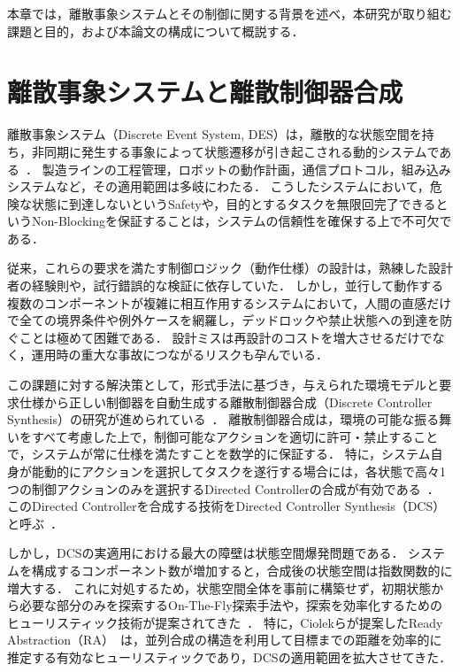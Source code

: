 \documentclass[a4paper,11pt,oneside,openany,report,dvipdfmx]{jsbook}
\begin{document}
本章では，離散事象システムとその制御に関する背景を述べ，本研究が取り組む課題と目的，および本論文の構成について概説する．

\section{離散事象システムと離散制御器合成}

離散事象システム（Discrete Event System, DES）は，離散的な状態空間を持ち，非同期に発生する事象によって状態遷移が引き起こされる動的システムである~\cite{DiscreteEventSystem}．
製造ラインの工程管理，ロボットの動作計画，通信プロトコル，組み込みシステムなど，その適用範囲は多岐にわたる．
こうしたシステムにおいて，危険な状態に到達しないというSafetyや，目的とするタスクを無限回完了できるというNon-Blockingを保証することは，システムの信頼性を確保する上で不可欠である．

従来，これらの要求を満たす制御ロジック（動作仕様）の設計は，熟練した設計者の経験則や，試行錯誤的な検証に依存していた．
しかし，並行して動作する複数のコンポーネントが複雑に相互作用するシステムにおいて，人間の直感だけで全ての境界条件や例外ケースを網羅し，デッドロックや禁止状態への到達を防ぐことは極めて困難である．
設計ミスは再設計のコストを増大させるだけでなく，運用時の重大な事故につながるリスクも孕んでいる．

この課題に対する解決策として，形式手法に基づき，与えられた環境モデルと要求仕様から正しい制御器を自動生成する離散制御器合成（Discrete Controller Synthesis）の研究が進められている~\cite{DiscreteControllerSynthesis}．
離散制御器合成は，環境の可能な振る舞いをすべて考慮した上で，制御可能なアクションを適切に許可・禁止することで，システムが常に仕様を満たすことを数学的に保証する．
特に，システム自身が能動的にアクションを選択してタスクを遂行する場合には，各状態で高々1つの制御アクションのみを選択するDirected Controllerの合成が有効である~\cite{DirectedController}．
このDirected Controllerを合成する技術をDirected Controller Synthesis（DCS）と呼ぶ~\cite{DirectedControllerSynthesis}．

しかし，DCSの実適用における最大の障壁は状態空間爆発問題である．
システムを構成するコンポーネント数が増加すると，合成後の状態空間は指数関数的に増大する．
これに対処するため，状態空間全体を事前に構築せず，初期状態から必要な部分のみを探索するOn-The-Fly探索手法や，探索を効率化するためのヒューリスティック技術が提案されてきた~\cite{Heuristic}．
特に，Ciolekらが提案したReady Abstraction（RA）~\cite{ReadyAbstraction}は，並列合成の構造を利用して目標までの距離を効率的に推定する有効なヒューリスティックであり，DCSの適用範囲を拡大させてきた．
\end{document}
